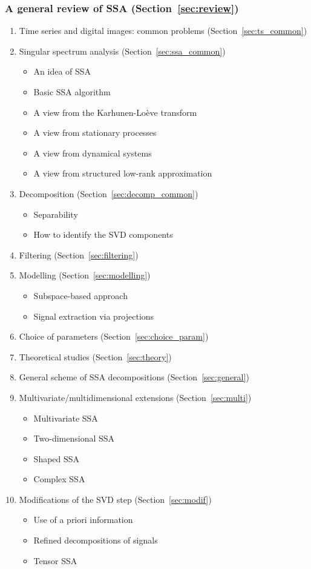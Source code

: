 \subsubsection{A general review of SSA (Section~\ref{sec:review})}
\begin{enumerate}
\item Time series and digital images: common problems (Section~\ref{sec:ts_common})
\item Singular spectrum analysis (Section~\ref{sec:ssa_common})
\begin{itemize}
\item An idea of SSA
\item Basic SSA algorithm
\item A view from the Karhunen-Lo\`{e}ve transform
\item A view from stationary processes
\item A view from dynamical systems
\item A view from structured low-rank approximation
\end{itemize}
\item Decomposition (Section~\ref{sec:decomp_common})
\begin{itemize}
\item Separability
\item How to identify the SVD components
\end{itemize}
\item Filtering (Section~\ref{sec:filtering})
\item Modelling (Section~\ref{sec:modelling})
\begin{itemize}
\item Subspace-based approach
\item Signal extraction via projections
\end{itemize}
\item Choice of parameters (Section~\ref{sec:choice_param})
\item Theoretical studies (Section~\ref{sec:theory})
\item General scheme of SSA decompositions (Section~\ref{sec:general})
\item Multivariate/multidimensional extensions (Section~\ref{sec:multi})
\begin{itemize}
\item Multivariate SSA
\item Two-dimensional SSA
\item Shaped SSA
\item Complex SSA
\end{itemize}
\item Modifications of the SVD step (Section~\ref{sec:modif})
\begin{itemize}
\item Use of a priori information
\item Refined decompositions of signals
\item Tensor SSA
\end{itemize}
\end{enumerate}
